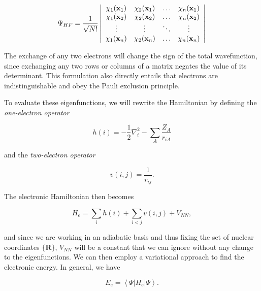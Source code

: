 \documentclass[12pt,letter,footinclude=true,headinclude=true,hyphens,oneside]{book} %
\begin{document}
    \begin{equation}
    \Psi_{HF} = \frac{1}{\sqrt{N!}}\left| \begin{array}{cccc}
        \chi_1(\mathbf{x}_1) & \chi_2(\mathbf{x}_1) & \mathellipsis & \chi_n(\mathbf{x}_1)  \\
        \chi_1(\mathbf{x}_2) & \chi_2(\mathbf{x}_2) & \mathellipsis & \chi_n(\mathbf{x}_2)  \\
        \vdots & \vdots & \ddots & \vdots  \\
        \chi_1(\mathbf{x}_n) & \chi_2(\mathbf{x}_n) & \mathellipsis & \chi_n(\mathbf{x}_n)  \end{array} \right|
    \end{equation}
    
    The exchange of any two electrons will change the sign of the total wavefunction, since exchanging any two rows or columns of a matrix negates the value of its determinant. This formulation also directly entails that electrons are indistinguishable and obey the Pauli exclusion principle.
    
    To evaluate these eigenfunctions, we will rewrite the Hamiltonian by defining the \emph{one-electron operator}
    
    \begin{equation}
    h(i) = -\frac{1}{2}\nabla_i^2 - \sum_A \frac{Z_A}{r_{iA}}
    \end{equation}
    
    and the \emph{two-electron operator}
    
    \begin{equation}
    v(i,j) = \frac{1}{r_{ij}}.
    \end{equation}
    
    The electronic Hamiltonian then becomes
    
    \begin{equation}
    H_e = \sum_i h(i) + \sum_{i < j} v(i,j) + V_{NN},
    \end{equation}
    
    and since we are working in an adiabatic basis and thus fixing the set of nuclear coordinates $\{\mathbf{R}\}$, $V_{NN}$ will be a constant that we can ignore without any change to the eigenfunctions. We can then employ a variational approach to find the electronic energy. In general, we have
    
    \begin{equation}
    E_e = \left < \Psi | H_e | \Psi \right >.
    \end{equation}
    
\end{document}
